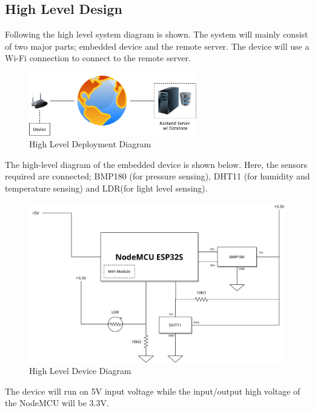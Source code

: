\documentclass[12pt,a4paper]{article}
\begin{document}

\subsection{High Level Design}

Following the high level system diagram is shown.
The system will mainly consist of two major parts; embedded device and the remote server.
The device will use a Wi-Fi connection to connect to the remote server.

\begin{figure}[h]
    \centering
    \includegraphics[width=0.65\textwidth]{./images/high-level-1.png}
    \caption{High Level Deployment Diagram}
\end{figure}

The high-level diagram of the embedded device is shown below.
Here, the sensors required are connected; BMP180 (for pressure sensing),
DHT11 (for humidity and temperature sensing) and LDR(for light level sensing).

\begin{figure}[h]
    \centering
    \includegraphics[width=\textwidth]{./images/high-level-2.png}
    \caption{High Level Device Diagram}
\end{figure}

\noindent The device will run on 5V input voltage while the input/output high
voltage of the NodeMCU will be 3.3V.
\end{document}
